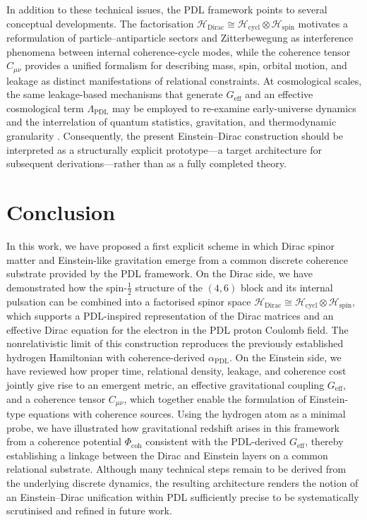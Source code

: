 \documentclass[11pt,a4paper]{article}
\theoremstyle{definition}
\newcommand{\PDL}{\mathrm{PDL}}
\newcommand{\Hspin}{\mathcal{H}_{\mathrm{spin}}}
\newcommand{\Hcycl}{\mathcal{H}_{\mathrm{cycl}}}
\newcommand{\HDirac}{\mathcal{H}_{\mathrm{Dirac}}}
\newcommand{\Geff}{G_{\mathrm{eff}}}
\newcommand{\alphaPDL}{\alpha_{\mathrm{PDL}}}
\newcommand{\Ccoh}{C_{\mu\nu}} %
\begin{document}
In addition to these technical issues, the PDL framework points to several conceptual developments. The factorisation $\HDirac \cong \Hcycl \otimes \Hspin$ motivates a reformulation of particle–antiparticle sectors and Zitterbewegung as interference phenomena between internal coherence-cycle modes, while the coherence tensor $\Ccoh$ provides a unified formalism for describing mass, spin, orbital motion, and leakage as distinct manifestations of relational constraints. At cosmological scales, the same leakage-based mechanisms that generate $\Geff$ and an effective cosmological term $\Lambda_{\PDL}$ may be employed to re-examine early-universe dynamics and the interrelation of quantum statistics, gravitation, and thermodynamic granularity \cite{PDL,A_Topological_Reformulation_in_the_Projective_Dynamic_Logo_Framework_Hierarchical_Coherence_Filtering_and_the_Exponent_18_in_PDL,PDL_Global_Mapping_Structures_Results_Open_Problems}. Consequently, the present Einstein–Dirac construction should be interpreted as a structurally explicit prototype—a target architecture for subsequent derivations—rather than as a fully completed theory.

\section*{Conclusion}

In this work, we have proposed a first explicit scheme in which Dirac spinor matter and Einstein-like gravitation emerge from a common discrete coherence substrate provided by the PDL framework. On the Dirac side, we have demonstrated how the spin-$\tfrac{1}{2}$ structure of the $(4,6)$ block and its internal pulsation can be combined into a factorised spinor space $\HDirac \cong \Hcycl \otimes \Hspin$, which supports a PDL-inspired representation of the Dirac matrices and an effective Dirac equation for the electron in the PDL proton Coulomb field. The nonrelativistic limit of this construction reproduces the previously established hydrogen Hamiltonian with coherence-derived $\alphaPDL$. On the Einstein side, we have reviewed how proper time, relational density, leakage, and coherence cost jointly give rise to an emergent metric, an effective gravitational coupling $\Geff$, and a coherence tensor $\Ccoh$, which together enable the formulation of Einstein-type equations with coherence sources. Using the hydrogen atom as a minimal probe, we have illustrated how gravitational redshift arises in this framework from a coherence potential $\Phi_{\mathrm{coh}}$ consistent with the PDL-derived $\Geff$, thereby establishing a linkage between the Dirac and Einstein layers on a common relational substrate. Although many technical steps remain to be derived from the underlying discrete dynamics, the resulting architecture renders the notion of an Einstein–Dirac unification within PDL sufficiently precise to be systematically scrutinised and refined in future work. 
\end{document}
